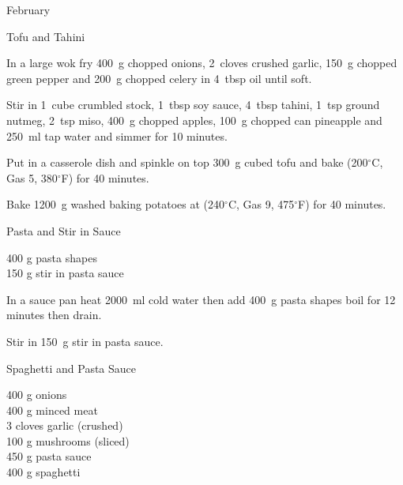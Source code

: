 \begin{menu}{February}
\begin{recipe}{2}{Tofu and Tahini}
\begin{ingredients}
		\end{ingredients}
	
    \begin{instructions}
    \item 
        In a large wok fry
        400~g chopped onions,
        2~cloves crushed garlic,
        150~g chopped green pepper
        and
        200~g chopped celery
        in
        4~tbsp  oil
        until soft.
      \item 
        Stir in
        1~cube crumbled stock,
        1~tbsp  soy sauce,
        4~tbsp  tahini,
        1~tsp  ground nutmeg,
        2~tsp  miso,
        400~g chopped apples,
        100~g chopped can pineapple
        and
        250~ml  tap water
        and simmer for 10 minutes.
      \item 
        Put in a casserole dish
        and spinkle on top
        300~g cubed tofu
        and bake (200$^{\circ}$C, Gas 5, 380$^{\circ}$F) for 40 minutes.
      \item 
      Bake 1200~g washed baking potatoes
      at
      (240$^{\circ}$C, Gas 9, 475$^{\circ}$F) for 40 minutes.
    
    \end{instructions}
    \end{recipe}%
  
    \begin{recipe}{1}{Pasta and Stir in Sauce}%
		\begin{ingredients}
		400 g pasta shapes  \\
	150 g stir in pasta sauce  \\
	
		\end{ingredients}
	
    \begin{instructions}
    \item 
      In a sauce pan heat
      2000~ml  cold water then add
      400~g  pasta shapes
      boil for 12
      minutes then drain.
    \item 
        Stir in
        150~g  stir in pasta sauce.
      
    \end{instructions}
    \end{recipe}%
  
    \begin{recipe}{2}{Spaghetti and Pasta Sauce}%
		\begin{ingredients}
		400 g onions  \\
	400 g minced meat  \\
	3 cloves garlic (crushed) \\
	100 g mushrooms (sliced) \\
	450 g pasta sauce  \\
	400 g spaghetti  \\
	

\end{ingredients}
\end{recipe}
\end{menu}

